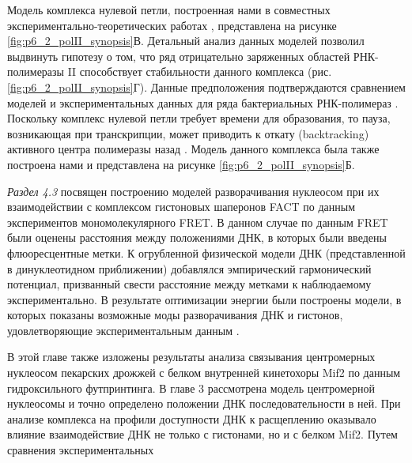  Модель комплекса нулевой петли, построенная нами в совместных экспериментально-теоретических работах , представлена на рисунке \ref{fig:p6_2_polII_synopsis}В. Детальный анализ данных моделей позволил выдвинуть гипотезу о том, что ряд отрицательно заряженных областей РНК-полимеразы II способствует стабильности данного комплекса (рис. \ref{fig:p6_2_polII_synopsis}Г). Данные предположения подтверждаются сравнением моделей и экспериментальных данных для ряда бактериальных РНК-полимераз \cite{chang_analysis_2014}. Поскольку комплекс нулевой петли требует времени для образования, то пауза, возникающая при транскрипции, может приводить к откату (backtracking) активного центра полимеразы назад \cite{gaykalova_structural_2015}. Модель данного комплекса была также построена нами и представлена на рисунке \ref{fig:p6_2_polII_synopsis}Б.



\textit{Раздел 4.3} посвящен построению моделей разворачивания нуклеосом при их взаимодействии с комплексом гистоновых шаперонов FACT по данным экспериментов мономолекулярного FRET.
В данном случае по данным FRET были оценены расстояния между положениями ДНК, в которых  были введены флюоресцентные метки. К огрубленной физической модели ДНК (представленной в динуклеотидном приближении) добавлялся эмпирический гармонический потенциал, призванный свести расстояние между метками к наблюдаемому экспериментально. В результате оптимизации энергии были построены модели, в которых показаны возможные моды разворачивания ДНК и гистонов, удовлетворяющие экспериментальным данным \cite{valieva_large-scale_2016}.

В этой главе также изложены результаты анализа связывания центромерных нуклеосом пекарских дрожжей с белком внутренней кинетохоры Mif2 по данным гидроксильного футпринтинга. В главе 3 рассмотрена модель центромерной нуклеосомы и точно определено положении ДНК последовательности в ней. При анализе комплекса на профили доступности ДНК к расщеплению оказывало влияние взаимодействие ДНК не только с гистонами, но и с белком Mif2. Путем сравнения экспериментальных 



